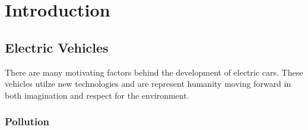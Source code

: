 

\chapter{Introduction}

\ifpdf
    \graphicspath{{1_introduction/figures/PNG/}{1_introduction/figures/PDF/}{1_introduction/figures/}}
\else
    \graphicspath{{1_introduction/figures/EPS/}{1_introduction/figures/}}
\fi







\section{Electric Vehicles} %
There are many motivating factors behind the development of electric cars. These vehicles utilze new technologies and are represent humanity moving forward in both imagination and respect for the environment.


\subsection{Pollution} %

